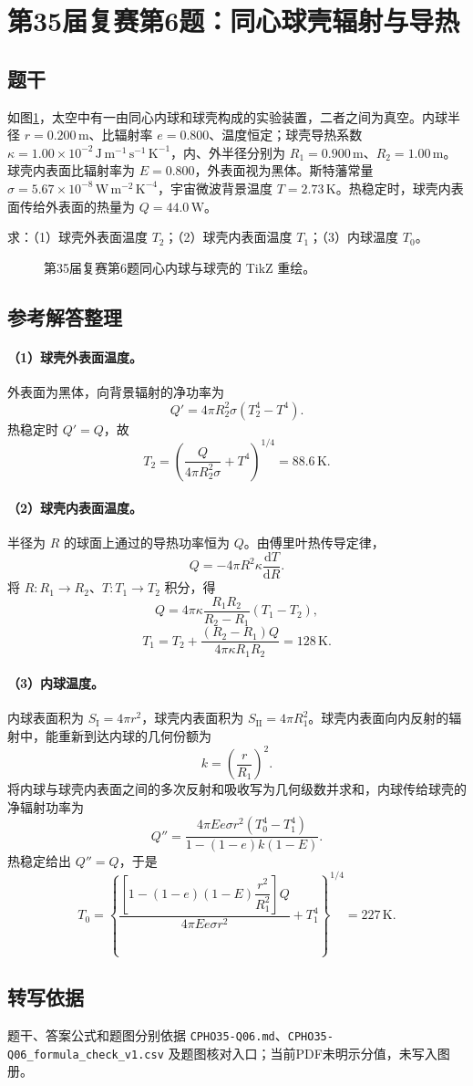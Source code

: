 \section{第35届复赛第6题：同心球壳辐射与导热}
\subsection{题干}
如图\ref{fig:cpho35q06}，太空中有一由同心内球和球壳构成的实验装置，二者之间为真空。内球半径 $r=0.200\,\mathrm m$、比辐射率 $e=0.800$、温度恒定；球壳导热系数 $\kappa=1.00\times10^{-2}\,\mathrm{J\,m^{-1}\,s^{-1}\,K^{-1}}$，内、外半径分别为 $R_1=0.900\,\mathrm m$、$R_2=1.00\,\mathrm m$。球壳内表面比辐射率为 $E=0.800$，外表面视为黑体。斯特藩常量 $\sigma=5.67\times10^{-8}\,\mathrm{W\,m^{-2}\,K^{-4}}$，宇宙微波背景温度 $T=2.73\,\mathrm K$。热稳定时，球壳内表面传给外表面的热量为 $Q=44.0\,\mathrm W$。

求：（1）球壳外表面温度 $T_2$；（2）球壳内表面温度 $T_1$；（3）内球温度 $T_0$。
\begin{figure}[htbp]\centering

\caption{第35届复赛第6题同心内球与球壳的 TikZ 重绘。}\label{fig:cpho35q06}
\end{figure}

\subsection{参考解答整理}
\paragraph{（1）球壳外表面温度。} 外表面为黑体，向背景辐射的净功率为
\[
Q'=4\pi R_2^2\sigma(T_2^4-T^4).
\]
热稳定时 $Q'=Q$，故
\[
T_2=\left(\frac{Q}{4\pi R_2^2\sigma}+T^4\right)^{1/4}
=\boxed{88.6\,\mathrm K}.
\]

\paragraph{（2）球壳内表面温度。} 半径为 $R$ 的球面上通过的导热功率恒为 $Q$。由傅里叶热传导定律，
\[
Q=-4\pi R^2\kappa\frac{\mathrm dT}{\mathrm dR}.
\]
将 $R:R_1\to R_2$、$T:T_1\to T_2$ 积分，得
\[
Q=4\pi\kappa\frac{R_1R_2}{R_2-R_1}(T_1-T_2),
\]
\[
T_1=T_2+\frac{(R_2-R_1)Q}{4\pi\kappa R_1R_2}
=\boxed{128\,\mathrm K}.
\]

\paragraph{（3）内球温度。} 内球表面积为 $S_{\mathrm I}=4\pi r^2$，球壳内表面积为 $S_{\mathrm{II}}=4\pi R_1^2$。球壳内表面向内反射的辐射中，能重新到达内球的几何份额为
\[
k=\left(\frac{r}{R_1}\right)^2.
\]
将内球与球壳内表面之间的多次反射和吸收写为几何级数并求和，内球传给球壳的净辐射功率为
\[
Q''=\frac{4\pi Ee\sigma r^2(T_0^4-T_1^4)}
{1-(1-e)k(1-E)}.
\]
热稳定给出 $Q''=Q$，于是
\[
T_0=
\left\{
\frac{\left[1-(1-e)(1-E)\dfrac{r^2}{R_1^2}\right]Q}
{4\pi Ee\sigma r^2}
+T_1^4
\right\}^{1/4}
=\boxed{227\,\mathrm K}.
\]

\subsection{转写依据}
题干、答案公式和题图分别依据 \texttt{CPHO35-Q06.md}、\texttt{CPHO35-Q06\_formula\_check\_v1.csv} 及题图核对入口；当前PDF未明示分值，未写入图册。
